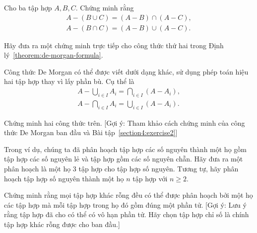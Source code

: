 \begin{exercise}\label{set-operations:exercise2}
    Cho ba tập hợp $A, B, C$. Chứng minh rằng
    \begin{equation*}
        \begin{split}
            A - (B\cup C) = (A - B) \cap (A - C), \\
            A - (B\cap C) = (A - B) \cup (A - C).
        \end{split}
    \end{equation*}
\end{exercise}

\begin{exercise}\label{set-operations:exercise3}
    Hãy đưa ra một chứng minh trực tiếp cho công thức thứ hai trong Định lý~\ref{theorem:de-morgan-formula}.
\end{exercise}

\begin{exercise}\label{set-operations:exercise4}
    Công thức De Morgan có thể được viết dưới dạng khác, sử dụng phép toán hiệu hai tập hợp thay vì lấy phần bù. Cụ thể là
    \begin{equation*}
        \begin{split}
            A - \bigcup_{i\in I}A_{i} = \bigcap_{i\in I}{(A - A_{i})}, \\
            A - \bigcap_{i\in I}A_{i} = \bigcup_{i\in I}{(A - A_{i})}.
        \end{split}
    \end{equation*}

    Chứng minh hai công thức trên. [Gợi ý: Tham khảo cách chứng minh của công thức De Morgan ban đầu và Bài tập~\ref{section4:exercise2}]
\end{exercise}

\begin{exercise}\label{set-operations:exercise5}
    Trong ví dụ, chúng ta đã phân hoạch tập hợp các số nguyên thành một họ gồm tập hợp các số nguyên lẻ và tập hợp gồm các số nguyên chẵn. Hãy đưa ra một phân hoạch là một họ 3 tập hợp cho tập hợp số nguyên. Tương tự, hãy phân hoạch tập hợp số nguyên thành một họ $n$ tập hợp với $n\geq 2$.
\end{exercise}

\begin{exercise}\label{set-operations:exercise6}
    Chứng minh rằng mọi tập hợp khác rỗng đều có thể được phân hoạch bởi một họ các tập hợp mà mỗi tập hợp trong họ đó gồm đúng một phần tử. [Gợi ý: Lưu ý rằng tập hợp đã cho có thể có vô hạn phần tử. Hãy chọn tập hợp chỉ số là chính tập hợp khác rỗng được cho ban đầu.]
\end{exercise}

